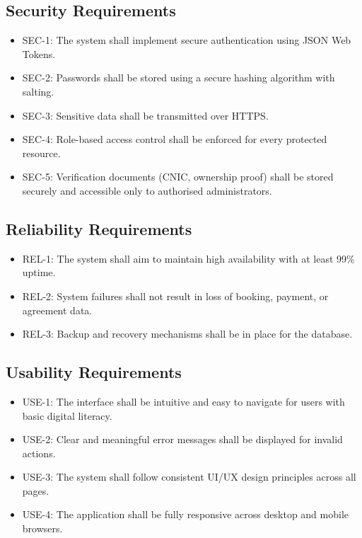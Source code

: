 \subsection{Security Requirements}

\begin{itemize}
\item SEC-1: The system shall implement secure authentication using JSON Web Tokens.
\item SEC-2: Passwords shall be stored using a secure hashing algorithm with salting.
\item SEC-3: Sensitive data shall be transmitted over HTTPS.
\item SEC-4: Role-based access control shall be enforced for every protected resource.
\item SEC-5: Verification documents (CNIC, ownership proof) shall be stored securely and accessible only to authorised administrators.
\end{itemize}

\subsection{Reliability Requirements}

\begin{itemize}
\item REL-1: The system shall aim to maintain high availability with at least 99\% uptime.
\item REL-2: System failures shall not result in loss of booking, payment, or agreement data.
\item REL-3: Backup and recovery mechanisms shall be in place for the database.
\end{itemize}

\subsection{Usability Requirements}

\begin{itemize}
\item USE-1: The interface shall be intuitive and easy to navigate for users with basic digital literacy.
\item USE-2: Clear and meaningful error messages shall be displayed for invalid actions.
\item USE-3: The system shall follow consistent UI/UX design principles across all pages.
\item USE-4: The application shall be fully responsive across desktop and mobile browsers.
\end{itemize}

